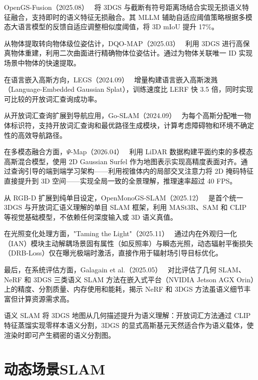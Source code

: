 OpenGS-Fusion（2025.08）~\cite{2508_01150} 将 3DGS 与截断有符号距离场结合实现无损语义特征融合，支持即时的语义特征无损融合。其 MLLM 辅助自适应阈值策略根据多模态大语言模型的反馈自适应调整相似度阈值，将 3D mIoU 提升 17\%。

从物体提取转向物体级位姿估计，DQO-MAP（2025.03）~\cite{2503_02223} 利用 3DGS 进行高保真物体重建，利用二次曲面进行精确物体位姿估计。通过为物体关联唯一 ID 实现场景中物体的快速提取。

在语言嵌入高斯方向，LEGS（2024.09）~\cite{2409_18108} 增量构建语言嵌入高斯泼溅（Language-Embedded Gaussian Splat），训练速度比 LERF 快 3.5 倍，同时实现可比较的开放词汇查询成功率。

从开放词汇查询扩展到导航应用，Go-SLAM（2024.09）~\cite{2409_16944} 为每个高斯分配唯一物体标识符，支持开放词汇查询和最优路径生成模块，计算考虑障碍物和环境不确定性的高效导航路径。

在多模态融合方面，$\Psi$-Map（2026.04）~\cite{2604_10982} 利用 LiDAR 数据构建平面约束的多模态高斯混合模型，使用 2D Gaussian Surfel 作为地图表示实现高精度表面对齐。通过查询引导的端到端学习架构——利用视锥体内的局部交叉注意力将 2D 掩码特征直接提升到 3D 空间——实现全局一致的全景理解，推理速率超过 40 FPS。

从 RGB-D 扩展到纯单目设定，OpenMonoGS-SLAM（2025.12）~\cite{2512_08625} 是首个统一 3DGS 与开放词汇语义理解的单目 SLAM 框架，利用 MASt3R、SAM 和 CLIP 等视觉基础模型，不依赖任何深度输入或 3D 语义真值。

在光照变化处理方面，"Taming the Light"（2025.11）~\cite{2511_22968} 通过内在外观归一化（IAN）模块主动解耦场景固有属性（如反照率）与瞬态光照，动态辐射平衡损失（DRB-Loss）仅在曝光极端时激活，直接作用于辐射场引导目标优化。

最后，在系统评估方面，Galagain et al.（2025.05）~\cite{2505_12384} 对比评估了几何 SLAM、NeRF 和 3DGS 三类语义 SLAM 方法在嵌入式平台（NVIDIA Jetson AGX Orin）上的精度、分割质量、内存使用和能耗，揭示 NeRF 和 3DGS 方法虽语义细节丰富但计算资源需求高。

\begin{takeaway}
语义 SLAM 将 3DGS 地图从几何描述提升为语义理解：开放词汇方法通过 CLIP 特征蒸馏实现零样本语义分割，3DGS 的显式高斯基元天然适合作为语义载体，使渲染时即可产生稠密的语义分割图。
\end{takeaway}



\section{动态场景SLAM}
\label{sec:15_6}

